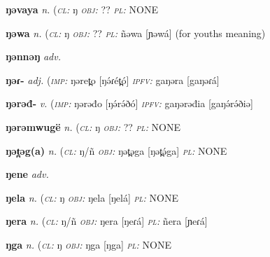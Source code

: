 {\newentry
\headword\textbf{ŋəvaya}  
\ipa{[ŋəvaja]}
\synpos\textit{n.} 
\class(\textit{\textsc{cl:}} {ŋ}
\object\textit{\textsc{obj:}} ??
\plural\textit{\textsc{pl:}} NONE

\newentry
\headword\textbf{ŋəwa}  
\ipa{[ŋəwá]}
\synpos\textit{n.} 
\class(\textit{\textsc{cl:}} {ŋ}
\object\textit{\textsc{obj:}} ??
\plural\textit{\textsc{pl:}} ñəwa [ɲəwá] (for youths meaning)


\newentry
\headword\textbf{ŋənnəŋ}  
\ipa{[ŋənːəŋ]}
\synpos\textit{adv.} 

\newentry
\headword\textbf{ŋəɾ-}  
\ipa{[ŋəɾ-]}
\synpos\textit{adj.} 
\imperative(\textit {\textsc{imp:}} ŋəret̪o [ŋə́ɾét̪ó]
\imperfective\textit{\textsc{ipfv:}} gaŋəra [gaŋəɾá] 

\newentry
\headword\textbf{ŋərəđ-}  
\ipa{[ŋə́rə́ð-]}
\synpos\textit{v.} 
\imperative(\textit {\textsc{imp:}} ŋərəđo [ŋə́rə́ðó]
\imperfective\textit{\textsc{ipfv:}} gaŋərəđia [gaŋə́rə́ðiə] 


\newentry
\headword\textbf{ŋərəmwugë}  
\ipa{[ŋərəmwugɜ]}
\synpos\textit{n.} 
\class(\textit{\textsc{cl:}} {ŋ}
\object\textit{\textsc{obj:}} ??
\plural\textit{\textsc{pl:}} NONE


\newentry
\headword\textbf{ŋət̪əg(a)}  
\ipa{[ŋət̪ə́g(a)]}
\synpos\textit{n.} 
\class(\textit{\textsc{cl:}} {ŋ/ñ}
\object\textit{\textsc{obj:}} ŋət̪əga [ŋət̪ə́ga]
\plural\textit{\textsc{pl:}} NONE

\newentry
\headword\textbf{ŋene}  
\ipa{[ŋéne]}
\synpos\textit{adv.} 

\newentry
\headword\textbf{ŋela}  
\ipa{[ŋelá]}
\synpos\textit{n.} 
\class(\textit{\textsc{cl:}} {ŋ}
\object\textit{\textsc{obj:}} ŋela [ŋelá]
\plural\textit{\textsc{pl:}} NONE

\newentry
\headword\textbf{ŋera}  
\ipa{[ŋeɾá]}
\synpos\textit{n.} 
\class(\textit{\textsc{cl:}} {ŋ/ñ}
\object\textit{\textsc{obj:}} ŋera [ŋeɾá]
\plural\textit{\textsc{pl:}} ñera [ɲeɾá]

\newentry
\headword\textbf{ŋga}  
\ipa{[ŋga]}
\synpos\textit{n.} 
\class(\textit{\textsc{cl:}} {ŋ}
\object\textit{\textsc{obj:}} ŋga [ŋga]
\plural\textit{\textsc{pl:}} NONE


}

